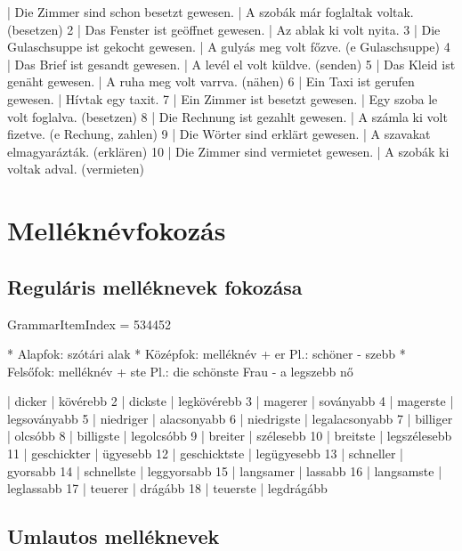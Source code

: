 \documentclass{article}
\newenvironment{desc}{\verbatim}{\endverbatim}
\newenvironment{exmp}{\verbatim}{\endverbatim}
\begin{document}
\begin{exmp}
1 | Die Zimmer sind schon besetzt gewesen. | A szobák már foglaltak voltak. (besetzen)
2 | Das Fenster ist geöffnet gewesen. | Az ablak ki volt nyita.
3 | Die Gulaschsuppe ist gekocht gewesen. | A gulyás meg volt főzve. (e Gulaschsuppe)
4 | Das Brief ist gesandt gewesen. | A levél el volt küldve. (senden)
5 | Das Kleid ist genäht gewesen. | A ruha meg volt varrva. (nähen)
6 | Ein Taxi ist gerufen gewesen. | Hívtak egy taxit.
7 | Ein Zimmer ist besetzt gewesen. | Egy szoba le volt foglalva. (besetzen)
8 | Die Rechnung ist gezahlt gewesen. | A számla ki volt fizetve. (e Rechung, zahlen)
9 | Die Wörter sind erklärt gewesen. | A szavakat elmagyarázták. (erklären)
10 | Die Zimmer sind vermietet gewesen. | A szobák ki voltak adval. (vermieten)
\end{exmp}

\section{Melléknévfokozás}

\subsection{Reguláris melléknevek fokozása}

GrammarItemIndex = 534452

\begin{desc}
* Alapfok: szótári alak
* Középfok: melléknév + er
  Pl.: schöner - szebb
* Felsőfok: melléknév + ste
  Pl.: die schönste Frau - a legszebb nő
\end{desc}

\begin{exmp}
1 | dicker | kövérebb
2 | dickste | legkövérebb
3 | magerer | soványabb
4 | magerste | legsoványabb
5 | niedriger | alacsonyabb
6 | niedrigste | legalacsonyabb
7 | billiger | olcsóbb
8 | billigste | legolcsóbb
9 | breiter | szélesebb
10 | breitste | legszélesebb
11 | geschickter | ügyesebb
12 | geschicktste | legügyesebb
13 | schneller | gyorsabb
14 | schnellste | leggyorsabb
15 | langsamer | lassabb
16 | langsamste | leglassabb
17 | teuerer | drágább
18 | teuerste | legdrágább
\end{exmp}

\subsection{Umlautos melléknevek}
\end{document}
